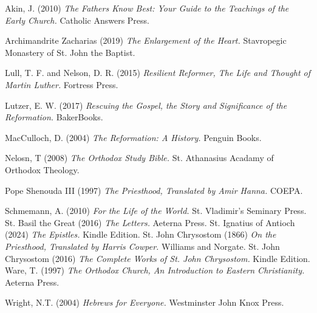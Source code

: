 \documentclass[12pt, doc]{apa7}   	%
\begin{document}
\begin{thebibliography}{15}

Akin, J. (2010) \emph{The Fathers Know Best: Your Guide to the Teachings of the Early Church.} Catholic Answers Press.
    
Archimandrite Zacharias (2019) \emph{The Enlargement of the Heart.} Stavropegic Monastery of St. John the Baptist.

Lull, T. F. and Nelson, D. R. (2015) \emph{Resilient Reformer, The Life and Thought of Martin Luther.} Fortress Press.

Lutzer, E. W. (2017) \emph{Rescuing the Gospel, the Story and Significance of the Reformation.} BakerBooks.

MacCulloch, D. (2004) \emph{The Reformation: A History.} Penguin Books.

Nelosn, T (2008) \emph{The Orthodox Study Bible.} St. Athanasius Acadamy of Orthodox Theology.

Pope Shenouda III (1997) \emph{The Priesthood, Translated by Amir Hanna.} COEPA. 

Schmemann, A. (2010) \emph{For the Life of the World.} St. Vladimir's Seminary Press.
St. Basil the Great (2016) \emph{The Letters.} Aeterna Press.
St. Ignatius of Antioch (2024) \emph{The Epistles.} Kindle Edition.
St. John Chrysostom  (1866) \emph{On the Priesthood, Translated by Harris Cowper.}  Williams and Norgate. 
St. John Chrysostom  (2016) \emph{The Complete Works of St. John Chrysostom.}  Kindle Edition. 
Ware, T. (1997) \emph{The Orthodox Church, An Introduction to Eastern Christianity.} Aeterna Press.

Wright, N.T. (2004) \emph{Hebrews for Everyone.} Westminster John Knox Press.

\end{thebibliography}
\end{document}
